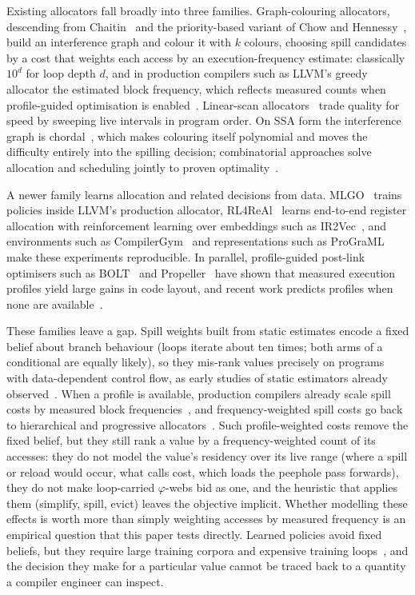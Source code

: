 \documentclass{ieeeaccess}
\begin{document}
Existing allocators fall broadly into three families. Graph-colouring
allocators, descending from Chaitin~\cite{chaitin1982} and the
priority-based variant of Chow and Hennessy~\cite{chow1990}, build an
interference graph and colour it with $k$ colours, choosing spill
candidates by a cost that weights each access by an execution-frequency
estimate: classically $10^{d}$ for loop depth $d$, and in production
compilers such as LLVM's greedy allocator the estimated block frequency,
which reflects measured counts when profile-guided optimisation is
enabled~\cite{olesen2011greedy,llvmbfi}. Linear-scan allocators~\cite{poletto1999} trade quality for speed
by sweeping live intervals in program order. On SSA form the
interference graph is chordal~\cite{hack2006ssa,hack2006ipl}, which makes
colouring itself polynomial and moves the difficulty entirely into the
spilling decision; combinatorial approaches solve allocation and
scheduling jointly to proven optimality~\cite{lozano2019toplas,lozano2019survey}.

A newer family learns allocation and related decisions from data.
MLGO~\cite{trofin2021mlgo} trains policies inside LLVM's production
allocator, RL4ReAl~\cite{venkatakeerthy2023rl4real} learns end-to-end
register allocation with reinforcement learning over embeddings such as
IR2Vec~\cite{venkatakeerthy2020ir2vec}, and environments such as
CompilerGym~\cite{cummins2022compilergym} and representations such as
ProGraML~\cite{cummins2021programl} make these experiments
reproducible. In parallel, profile-guided post-link optimisers such as
BOLT~\cite{panchenko2019bolt} and Propeller~\cite{shen2023propeller}
have shown that measured execution profiles yield large gains in code
layout, and recent work predicts profiles when none are
available~\cite{rotem2021pgo}.

These families leave a gap. Spill weights built from static estimates
encode a fixed belief about branch behaviour (loops iterate about ten
times; both arms of a conditional are equally likely), so they mis-rank
values precisely on programs with data-dependent control flow, as early
studies of static estimators already observed~\cite{wagner1994,wu1994,wall1991}.
When a profile is available, production compilers already scale spill
costs by measured block frequencies~\cite{olesen2011greedy,llvmbfi},
and frequency-weighted spill costs go back to hierarchical and
progressive allocators~\cite{callahan1991,koes2006}. Such
profile-weighted costs remove the fixed belief, but they still rank a
value by a frequency-weighted count of its accesses: they do not model
the value's residency over its live range (where a spill or reload
would occur, what calls cost, which loads the peephole pass forwards),
they do not make loop-carried $\varphi$-webs bid as one, and the
heuristic that applies them (simplify, spill, evict) leaves the
objective implicit. Whether modelling these effects is worth more than
simply weighting accesses by measured frequency is an empirical
question that this paper tests directly. Learned policies
avoid fixed beliefs, but they require large training corpora and
expensive training loops~\cite{sutton2018rl}, and the decision they make
for a particular value cannot be traced back to a quantity a compiler
engineer can inspect.
\end{document}
